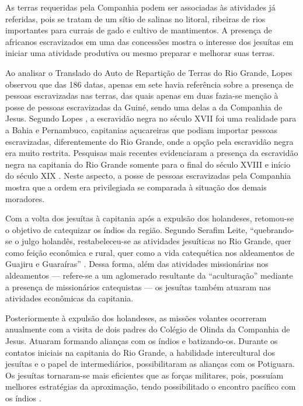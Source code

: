 \begin{refsection}
As terras requeridas pela Companhia podem ser associadas às atividades já referidas, pois se tratam de um sítio de salinas no litoral, ribeiras de rios importantes para currais de gado e cultivo de mantimentos. A presença de africanos escravizados em uma das concessões mostra o interesse dos jesuítas em iniciar uma atividade produtiva ou mesmo preparar e melhorar suas terras.  

Ao analisar o Translado do Auto de Repartição de Terras do Rio Grande, Lopes \citeyear[p.~103]{Lopes2003} observou que das 186 datas, apenas em sete havia referência sobre a presença de pessoas escravizadas nas terras, das quais apenas em duas fazia-se menção à posse de pessoas escravizadas da Guiné, sendo uma delas a da Companhia de Jesus. Segundo Lopes \citeyear[p.~68]{Lopes2003}, a escravidão negra no século XVII foi uma realidade para a Bahia e Pernambuco, capitanias açucareiras que podiam importar pessoas escravizadas, diferentemente do Rio Grande, onde a opção pela escravidão negra era muito restrita. Pesquisas mais recentes evidenciaram a presença da escravidão negra na capitania do Rio Grande somente para o final do século XVIII e início do século XIX \cites{Macedo2007,Souza2013}. Neste aspecto, a posse de pessoas escravizadas pela Companhia mostra que a ordem era privilegiada se comparada à situação dos demais moradores.  

Com a volta dos jesuítas à capitania após a expulsão dos holandeses, retomou-se o objetivo de catequizar os índios da região. Segundo Serafim Leite, “quebrando-se o julgo holandês, restabeleceu-se as atividades jesuíticas no Rio Grande, quer como feição econômica e rural, quer como a vida catequética nos aldeamentos de Guajiru e Guaraíras” \cite[Tombo~V,~p.~370]{Leite2004}. Dessa forma, além das atividades missionárias nos aldeamentos --- refere-se a um aglomerado resultante da “aculturação” mediante a presença de missionários catequistas \cite[p.~39]{Azevedo1957} --- os jesuítas também atuaram nas atividades econômicas da capitania.

Posteriormente à expulsão dos holandeses, as missões volantes ocorreram anualmente com a visita de dois padres do Colégio de Olinda da Companhia de Jesus. Atuaram formando alianças com os índios e batizando-os. Durante os contatos iniciais na capitania do Rio Grande, a habilidade intercultural dos jesuítas e o papel de intermediários, possibilitaram as alianças com os Potiguara. Os jesuítas tornaram-se mais eficientes que as forças militares, pois, possuíam melhores estratégias da aproximação, tendo possibilitado o encontro pacífico com os índios \cite[p.~88]{Porto2000}. 


\end{refsection}
